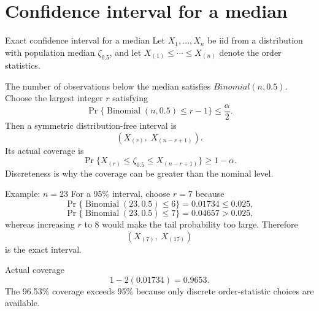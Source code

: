 \documentclass[aspectratio=169,11pt]{beamer}
\begin{document}

\section{Confidence interval for a median}

\begin{frame}{Exact confidence interval for a median}
  Let \(X_1,\ldots,X_n\) be iid from a distribution with population
  median \(\zeta_{0.5}\), and let
  \(X_{(1)}\leq\cdots\leq X_{(n)}\) denote the order statistics.

  The number of observations below the median satisfies $Binomial(n, 0.5)$.
  Choose the largest integer \(r\) satisfying
  \[
    \Pr\{\operatorname{Binomial}(n,0.5)\leq r-1\}\leq\frac{\alpha}{2}.
  \]
  Then a symmetric distribution-free interval is
  \[
    {\left(X_{(r)},\;X_{(n-r+1)}\right)}.
  \]
  Its actual coverage is
  \[
    \Pr\{X_{(r)}\leq\zeta_{0.5}\leq X_{(n-r+1)}\}\geq 1-\alpha.
  \]
  Discreteness is why the coverage can be greater than the nominal level.
\end{frame}

\begin{frame}{Example: \(n=23\)}
  For a 95\% interval, choose \(r=7\) because
  \[
    \Pr\{\operatorname{Binomial}(23,0.5)\leq 6\}=0.01734\leq0.025,
  \]
  \[
    \Pr\{\operatorname{Binomial}(23,0.5)\leq 7\}=0.04657>0.025,
  \]
  whereas increasing \(r\) to 8 would make the tail probability too large.
  Therefore
  \[
    {\left(X_{(7)},\;X_{(17)}\right)}
  \]
  is the exact interval.

  \begin{block}{Actual coverage}
    \[
      1-2(0.01734)=0.9653.
    \]
    The 96.53\% coverage exceeds 95\% because only discrete order-statistic choices
    are available.
  \end{block}
\end{frame}
\end{document}
